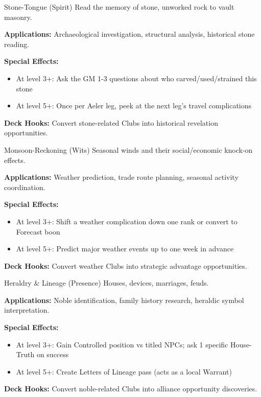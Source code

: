 \documentclass[11pt]{report}
\begin{document}
\begin{skillbox}{Stone-Tongue (Spirit)}
Read the memory of stone, unworked rock to vault masonry.

\textbf{Applications:} Archaeological investigation, structural analysis, historical stone reading.

\textbf{Special Effects:}
\begin{itemize}
    \item At level 3+: Ask the GM 1-3 questions about who carved/used/strained this stone
    \item At level 5+: Once per Aeler leg, peek at the next leg's travel complications
\end{itemize}

\textbf{Deck Hooks:} Convert stone-related Clubs into historical revelation opportunities.
\end{skillbox}

\begin{skillbox}{Monsoon-Reckoning (Wits)}
Seasonal winds and their social/economic knock-on effects.

\textbf{Applications:} Weather prediction, trade route planning, seasonal activity coordination.

\textbf{Special Effects:}
\begin{itemize}
    \item At level 3+: Shift a weather complication down one rank or convert to Forecast boon
    \item At level 5+: Predict major weather events up to one week in advance
\end{itemize}

\textbf{Deck Hooks:} Convert weather Clubs into strategic advantage opportunities.
\end{skillbox}

\begin{skillbox}{Heraldry \& Lineage (Presence)}
Houses, devices, marriages, feuds.

\textbf{Applications:} Noble identification, family history research, heraldic symbol interpretation.

\textbf{Special Effects:}
\begin{itemize}
    \item At level 3+: Gain Controlled position vs titled NPCs; ask 1 specific House-Truth on success
    \item At level 5+: Create Letters of Lineage pass (acts as a local Warrant)
\end{itemize}

\textbf{Deck Hooks:} Convert noble-related Clubs into alliance opportunity discoveries.
\end{skillbox}
\end{document}
